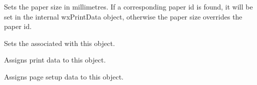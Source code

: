 \label{wxpagesetupdialogdatasetpapersize}


Sets the paper size in millimetres. If a corresponding paper id is found, it will be set in the
internal wxPrintData object, otherwise the paper size overrides the paper id.

\label{wxpagesetupdialogdatasetprintdata}


Sets the  associated with this object.

\label{wxpagesetupdialogdataassign}


Assigns print data to this object.


Assigns page setup data to this object.


